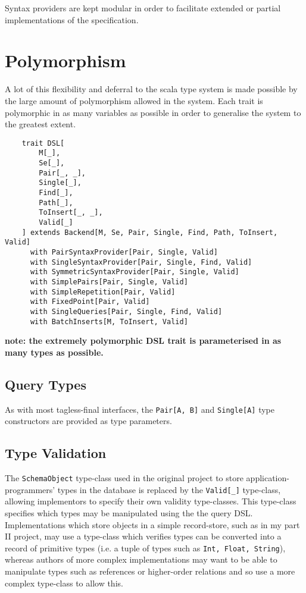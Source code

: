 \documentclass{report}
\newcommand \2[0]{\textbf{2}}
\newcommand \3[0]{\textbf{3}}
\newcommand{\todo}[1]{\textbf{#1}}
\begin{document}
Syntax providers are kept modular in order to facilitate extended or partial implementations of the specification. 


\section{Polymorphism}
A lot of this flexibility and deferral to the scala type system is made possible by the large amount of polymorphism allowed in the system. Each trait is polymorphic in as many variables as possible in order to generalise the system to the greatest extent.


\begin{verbatim}
    trait DSL[
        M[_], 
        Se[_], 
        Pair[_, _], 
        Single[_], 
        Find[_], 
        Path[_], 
        ToInsert[_, _], 
        Valid[_]
    ] extends Backend[M, Se, Pair, Single, Find, Path, ToInsert, Valid]
      with PairSyntaxProvider[Pair, Single, Valid]
      with SingleSyntaxProvider[Pair, Single, Find, Valid]
      with SymmetricSyntaxProvider[Pair, Single, Valid]
      with SimplePairs[Pair, Single, Valid]
      with SimpleRepetition[Pair, Valid]
      with FixedPoint[Pair, Valid]
      with SingleQueries[Pair, Single, Find, Valid]
      with BatchInserts[M, ToInsert, Valid]
\end{verbatim}
\todo{note: the extremely polymorphic DSL trait is parameterised in as many types as possible.}

\subsection{Query Types}
As with most tagless-final interfaces, the \texttt{Pair[A, B]} and \texttt{Single[A]} type constructors are provided as type parameters.
\subsection{Type Validation}
The \texttt{SchemaObject} type-class used in the original project to store application-programmers' types in the database is replaced by the \texttt{Valid[_]} type-class, allowing implementors to specify their own validity type-classes. This type-class specifies which types may be manipulated using the the query DSL. Implementations which store objects in a simple record-store, such as in my part II project, may use a type-class which verifies types can be converted into a record of primitive types (i.e. a tuple of types such as \texttt{Int, Float, String}), whereas authors of more complex implementations may want to be able to manipulate types such as references or higher-order relations and so use a more complex type-class to allow this.
\end{document}
